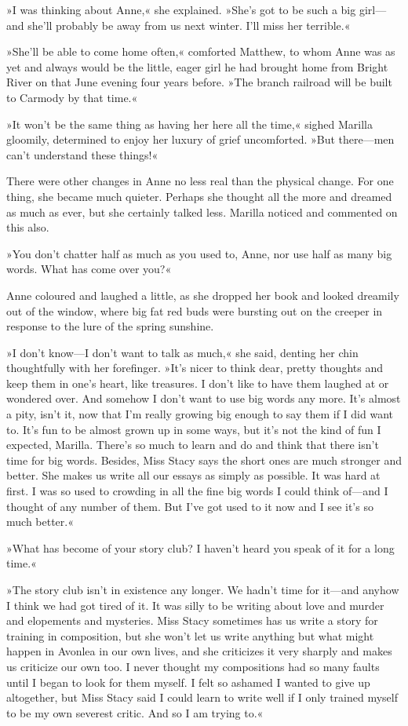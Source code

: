 »I was thinking about Anne,« she explained. »She’s got to be such a big girl—and she’ll probably be away from us next winter. I’ll miss her terrible.«

»She’ll be able to come home often,« comforted Matthew, to whom Anne was as yet and always would be the little, eager girl he had brought home from Bright River on that June evening four years before. »The branch railroad will be built to Carmody by that time.«

»It won’t be the same thing as having her here all the time,« sighed Marilla gloomily, determined to enjoy her luxury of grief uncomforted. »But there—men can’t understand these things!«

There were other changes in Anne no less real than the physical change. For one thing, she became much quieter. Perhaps she thought all the more and dreamed as much as ever, but she certainly talked less. Marilla noticed and commented on this also.

»You don’t chatter half as much as you used to, Anne, nor use half as many big words. What has come over you?«

Anne coloured and laughed a little, as she dropped her book and looked dreamily out of the window, where big fat red buds were bursting out on the creeper in response to the lure of the spring sunshine.

»I don’t know—I don’t want to talk as much,« she said, denting her chin thoughtfully with her forefinger. »It’s nicer to think dear, pretty thoughts and keep them in one’s heart, like treasures. I don’t like to have them laughed at or wondered over. And somehow I don’t want to use big words any more. It’s almost a pity, isn’t it, now that I’m really growing big enough to say them if I did want to. It’s fun to be almost grown up in some ways, but it’s not the kind of fun I expected, Marilla. There’s so much to learn and do and think that there isn’t time for big words. Besides, Miss Stacy says the short ones are much stronger and better. She makes us write all our essays as simply as possible. It was hard at first. I was so used to crowding in all the fine big words I could think of—and I thought of any number of them. But I’ve got used to it now and I see it’s so much better.«

»What has become of your story club? I haven’t heard you speak of it for a long time.«

»The story club isn’t in existence any longer. We hadn’t time for it—and anyhow I think we had got tired of it. It was silly to be writing about love and murder and elopements and mysteries. Miss Stacy sometimes has us write a story for training in composition, but she won’t let us write anything but what might happen in Avonlea in our own lives, and she criticizes it very sharply and makes us criticize our own too. I never thought my compositions had so many faults until I began to look for them myself. I felt so ashamed I wanted to give up altogether, but Miss Stacy said I could learn to write well if I only trained myself to be my own severest critic. And so I am trying to.«

